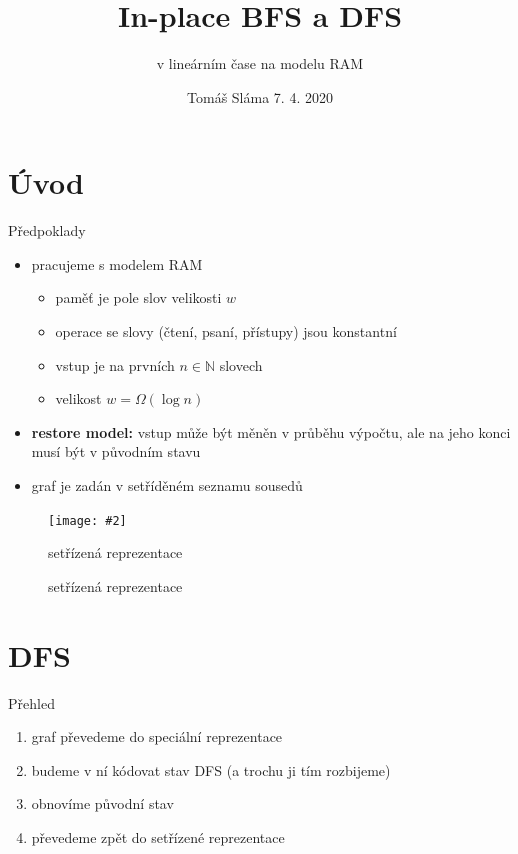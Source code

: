 \documentclass[czech]{beamer}
\title{In-place BFS a DFS}
\subtitle{v lineárním čase na modelu RAM}
\date{Tomáš Sláma \hfill 7. 4. 2020}
\makeatletter
\newcommand{\fitimage}[2][\@nil]{
	\begin{figure}
		\begin{adjustbox}{width=0.9\textwidth, totalheight=\textheight-2\baselineskip-2\baselineskip,keepaspectratio}
			\texttt{[image: \#2]}
		\end{adjustbox}
		\def\tmp{#1}%
	 \ifx\tmp\@nnil
			\else
			\caption{#1}
		\fi
	\end{figure}
}
\makeatother
\begin{document}
	\begin{frame}
		\maketitle
	\end{frame}
	
	\section{Úvod}
	\begin{frame}{Předpoklady}
		\begin{itemize}
			\item pracujeme s modelem RAM
			\begin{itemize}
				\item paměť je pole slov velikosti $w$
				\item operace se slovy (čtení, psaní, přístupy) jsou konstantní
				\item vstup je na prvních $n \in \mathbb{N}$ slovech
				\item velikost $w = \Omega\left(\log n\right)$
			\end{itemize}
			\vfill
			\item \textbf{restore model:} vstup může být měněn v průběhu výpočtu, ale na jeho konci musí být v původním stavu
			\vfill
			\item graf je zadán v setříděném seznamu sousedů
		\end{itemize}

		\fitimage[setřízená reprezentace]{images/sorted.png}
	\end{frame}

	\section{DFS}

	\begin{frame}{Přehled}
		\begin{enumerate}
			\item graf převedeme do speciální reprezentace
			\item budeme v ní kódovat stav DFS (a trochu ji tím rozbijeme)
			\item obnovíme původní stav
			\item převedeme zpět do setřízené reprezentace
		\end{enumerate}
	\end{frame}
\end{document}

